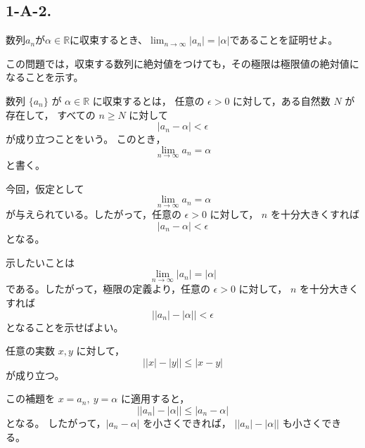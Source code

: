 \subsection{1-A-2.}
\begin{exercise}
	数列${a_n}$が$\alpha\in\mathbb{R}$に収束するとき、$\lim_{n\rightarrow\infty}|a_n|=|\alpha|$であることを証明せよ。
\end{exercise}

\begin{background}
	この問題では，収束する数列に絶対値をつけても，その極限は極限値の絶対値になることを示す。

	\begin{definition}[数列の収束]
		数列 $\{a_n\}$ が $\alpha\in\mathbb{R}$ に収束するとは，
		任意の $\epsilon>0$ に対して，ある自然数 $N$ が存在して，
		すべての $n\geq N$ に対して
		\[
			|a_n-\alpha|<\epsilon
		\]
		が成り立つことをいう。
		このとき，
		\[
			\lim_{n\to\infty}a_n=\alpha
		\]
		と書く。
	\end{definition}

	\begin{remark}
		今回，仮定として
		\[
			\lim_{n\to\infty}a_n=\alpha
		\]
		が与えられている。したがって，任意の $\epsilon>0$ に対して，
		$n$ を十分大きくすれば
		\[
			|a_n-\alpha|<\epsilon
		\]
		となる。
	\end{remark}

	\begin{remark}
		示したいことは
		\[
			\lim_{n\to\infty}|a_n|=|\alpha|
		\]
		である。したがって，極限の定義より，任意の $\epsilon>0$ に対して，
		$n$ を十分大きくすれば
		\[
			\bigl||a_n|-|\alpha|\bigr|<\epsilon
		\]
		となることを示せばよい。
	\end{remark}

	\begin{lemma}[逆三角不等式]
		任意の実数 $x,y$ に対して，
		\[
			\bigl||x|-|y|\bigr|\leq |x-y|
		\]
		が成り立つ。
	\end{lemma}

	\begin{remark}
		この補題を $x=a_n,\ y=\alpha$ に適用すると，
		\[
			\bigl||a_n|-|\alpha|\bigr|
			\leq |a_n-\alpha|
		\]
		となる。
		したがって，$|a_n-\alpha|$ を小さくできれば，
		$\bigl||a_n|-|\alpha|\bigr|$ も小さくできる。
	\end{remark}
\end{background}

